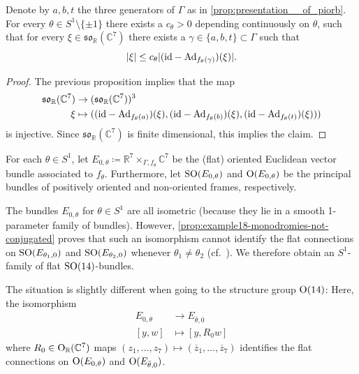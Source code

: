 \documentclass[11pt,a4paper]{scrartcl}
\newcommand{\Ad}{\textup{Ad}}
\newcommand{\id}{\textup{id}}
\newcommand{\SO}{\textup{SO}}
\renewcommand{\O}{\textup{O}}
\numberwithin{equation}{section}
\theoremstyle{plain}
\theoremstyle{definition}
\theoremstyle{remark}
\begin{document}
\begin{proposition}\label{prop:example18_no_fixpoints_quantitative_version}
Denote by $a,b,t$ the three generators of $\Gamma$ as in \autoref{prop:presentation__of_piorb}. For every $\theta \in S^1 \setminus \{\pm 1\}$ there exists a $c_\theta >0$ depending continuously on $\theta$, such that for every $\xi \in \mathfrak{so}_{\mathbb{R}}(\mathbb{C}^7)$ there exists a $\gamma \in \{a,b,t \} \subset \Gamma$ such that \[ \vert \xi \vert \leq c_\theta \vert (\id - \Ad_{f_\theta(\gamma)}) (\xi) \vert. \]
\end{proposition}
\begin{proof}
The previous proposition implies that the map 
\begin{align*}
\mathfrak{so}_{\mathbb{R}}(\mathbb{C}^7) &\to (\mathfrak{so}_{\mathbb{R}}(\mathbb{C}^7))^3 \\
\xi &\mapsto ((\id -\Ad_{f_{\theta}(a)}) (\xi),(\id -\Ad_{f_{\theta}(b)}) (\xi),(\id -\Ad_{f_{\theta}(t)}) (\xi)))
\end{align*}
is injective. Since $\mathfrak{so}_{\mathbb{R}}(\mathbb{C}^7)$ is finite dimensional, this implies the claim.
\end{proof}


\begin{definition}\label{def:example18_flat_bundles}
For each $\theta \in S^1$, let $E_{0,\theta} \coloneqq \mathbb{R}^7 \times_{\Gamma, f_\theta} \mathbb{C}^7$ be the (flat) oriented Euclidean vector bundle associated to $f_\theta$. Furthermore, let $\SO(E_{0,\theta})$ and $\O(E_{0,\theta})$ be the principal bundles of positively oriented and non-oriented frames, respectively.
\end{definition}

\begin{remark}\label{rem:example18_bundles_are_isomorphic}
The bundles $E_{0,\theta}$ for $\theta\in S^1$ are all isometric (because they lie in a smooth 1-parameter family of bundles). However, \autoref{prop:example18-monodromies-not-conjugated} proves that such an isomorphism cannot identify the flat connections on $\SO(E_{\theta_1,0})$ and $\SO(E_{\theta_2,0})$ whenever $\theta_1 \neq \theta_2$ (cf.~\cite[Proposition~2.2.3]{DonaldsonKronheimer}). We therefore obtain an $S^1$-family of flat $\SO(14)$-bundles. 

The situation is slightly different when going to the structure group $\O(14)$: Here, the isomorphism 
\begin{align*}
E_{0,\theta} &\to E_{\bar{\theta},0} \\
[y,w]&\mapsto[y,R_0w]
\end{align*}
where $R_0 \in \O_\mathbb{R}(\mathbb{C}^7)$ maps $(z_1,\dots,z_7) \mapsto (\overline{z}_1,\dots,\overline{z}_7)$ identifies the flat connections on $\O(E_{0,\theta})$ and $\O(E_{\bar{\theta},0})$.
\end{remark}
\end{document}
